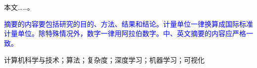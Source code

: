 




\vspace*{-10mm}

\begin{center}
  \heiti{}\textmd{\thesisTitle}
  \vspace{2mm}
  \ifhaveSubTitle
  \begin{spacing}{1.2}
    \sihao\selectfont{\textmd{\kaitigb{-----}\thesisSubTitle}}
  \end{spacing}
  \fi
\end{center}

\vspace*{0mm}

{\let\clearpage\relax \chapter*{\textmd{}}}
\setcounter{page}{1}

\vspace*{-12mm}

\setlength{\parskip}{0em}

\textbf{\heiti{}}
本文……。

\textcolor{blue}{摘要的内容要包括研究的目的、方法、结果和结论。计量单位一律换算成国际标准计量单位。除特殊情况外，数字一律用阿拉伯数字。中、英文摘要的内容应严格一致。}

\vspace{1em}
\textbf{\heiti{}}
计算机科学与技术；算法；复杂度；深度学习；机器学习；可视化

\vspace*{15mm}

\begin{spacing}{0.95}
  \centering
  \textbf{\thesisTitleEN}
  \vspace{2mm}
  \ifhaveSubTitle
  \begin{spacing}{1.2}
    \sihao\selectfont{\textmd{{-----}\thesisSubTitleEN}}
  \end{spacing}
  \fi
\end{spacing}

